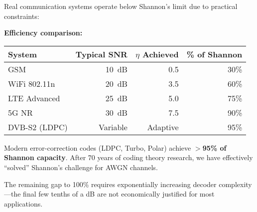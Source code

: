 Real communication systems operate below Shannon's limit due to practical constraints:

\begin{center}
\end{center}

\textbf{Efficiency comparison:}

\begin{center}
\begin{tabular}{@{}lrrr@{}}
\toprule
System & Typical SNR & $\eta$ Achieved & \% of Shannon \\
\midrule
GSM & 10~dB & 0.5 & 30\% \\
WiFi 802.11n & 20~dB & 3.5 & 60\% \\
LTE Advanced & 25~dB & 5.0 & 75\% \\
5G NR & 30~dB & 7.5 & 90\% \\
DVB-S2 (LDPC) & Variable & Adaptive & 95\% \\
\bottomrule
\end{tabular}
\end{center}

\begin{keyconcept}
Modern error-correction codes (LDPC, Turbo, Polar) achieve \textbf{$>$95\% of Shannon capacity}. After 70 years of coding theory research, we have effectively ``solved'' Shannon's challenge for AWGN channels.

The remaining gap to 100\% requires exponentially increasing decoder complexity---the final few tenths of a dB are not economically justified for most applications.
\end{keyconcept}

